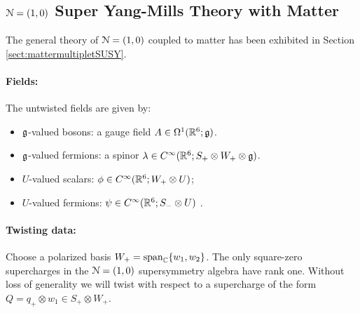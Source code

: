 \documentclass[10pt, oneside]{article}
\begin{document}
\subsection{\texorpdfstring{$\mathcal{N} = (1,0)$}{N=(1,0)} Super Yang-Mills Theory with Matter} \label{6d_10_section}

The general theory of $\mathcal{N} = (1,0)$ coupled to matter has been exhibited in Section \ref{sect:mattermultipletSUSY}. 

\vspace{-10pt}
\paragraph{Fields:}
The untwisted fields are given by:
\begin{itemize}
\item $\mathfrak g$-valued bosons: a gauge field $A \in \Omega^1(\mathbb R^6;\mathfrak g)$.
\item $\mathfrak g$-valued fermions: a spinor $\lambda \in C^\infty(\mathbb R^6 ; S_+ \otimes W_+ \otimes \mathfrak g)$. 
\item $U$-valued scalars: $\phi \in C^\infty(\mathbb R^6 ; W_+ \otimes U)$;
\item $U$-valued fermions: $\psi \in C^\infty(\mathbb R^6 ; S_- \otimes U)$ .
\end{itemize}

\vspace{-10pt}
\paragraph{Twisting data:}
Choose a polarized basis $W_+ = {\rm span}_{\mathbb C}\{w_1, w_2\}$.
The only square-zero supercharges in the $\mathcal{N}=(1,0)$ supersymmetry algebra have rank one.  Without loss of generality we will twist with respect to a supercharge of the form $Q = q_+ \otimes w_1 \in S_+ \otimes W_+$. 
\end{document}
